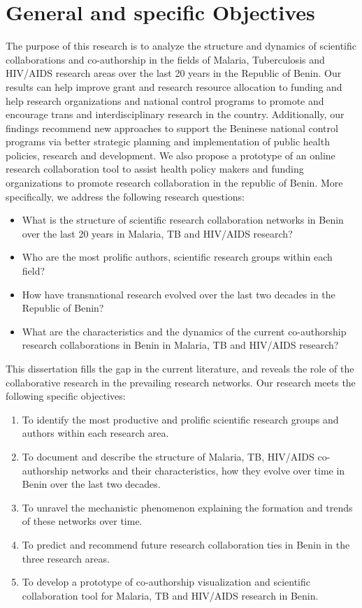 \section{General and specific Objectives}
The purpose of this research is to analyze the structure and dynamics of scientific collaborations and co-authorship in the fields of Malaria, Tuberculosis and HIV/AIDS research areas over the last 20 years in the Republic of Benin. Our results can help improve grant and research resource allocation to funding and help research organizations and national control programs to promote and encourage trans and interdisciplinary research in the country. Additionally, our findings recommend new approaches to support the Beninese national control programs via better strategic planning and implementation of public health policies, research and development. We also propose a prototype of an online research collaboration tool to assist health policy makers and funding organizations to promote research collaboration in the republic of Benin. More specifically, we address the following research questions:
\begin{itemize}
	\item What is the structure of scientific research collaboration networks in Benin over the last 20 years in Malaria, TB and HIV/AIDS research?
	\item Who are the most prolific authors, scientific research groups within each field?
	\item How have transnational research evolved over the last two decades in the Republic of Benin?
	\item What are the characteristics and the dynamics of the current co-authorship research collaborations in Benin in Malaria, TB and HIV/AIDS research?
\end{itemize}
This dissertation fills the gap in the current literature, and reveals the role of the collaborative research in the prevailing research networks. Our research meets the following specific objectives:
\begin{enumerate}
	\item To identify the most productive and prolific scientific research groups and authors within each research area.
	\item To document and describe the structure of Malaria, TB, HIV/AIDS co-authorship networks and their characteristics, how they evolve over time in Benin over the last two decades.
	\item To unravel the mechanistic phenomenon explaining the formation and trends of these networks over time.
	\item To predict and recommend future research collaboration ties in Benin in the three research areas.
	\item To develop a prototype of co-authorship visualization and scientific collaboration tool for Malaria, TB and HIV/AIDS research in Benin.
\end{enumerate}	
\pagebreak
